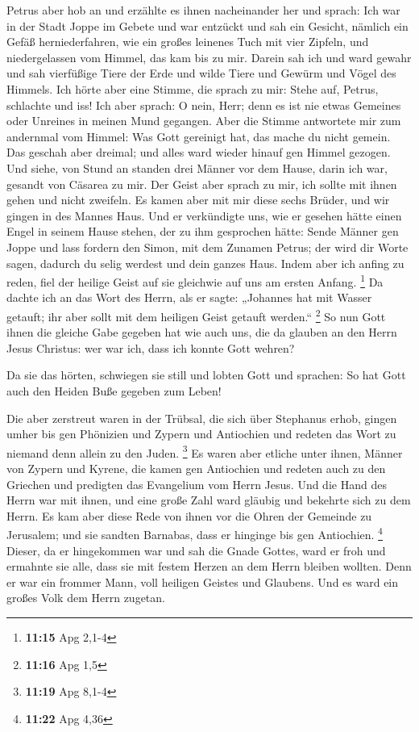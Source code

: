 Petrus aber hob an und erzählte es ihnen nacheinander her
und sprach:  Ich war in der Stadt Joppe im Gebete und war
entzückt und sah ein Gesicht, nämlich ein Gefäß herniederfahren, wie ein
großes leinenes Tuch mit vier Zipfeln, und niedergelassen vom Himmel,
das kam bis zu mir.  Darein sah ich und ward gewahr und
sah vierfüßige Tiere der Erde und wilde Tiere und Gewürm und Vögel des
Himmels.  Ich hörte aber eine Stimme, die sprach zu mir:
Stehe auf, Petrus, schlachte und iss!  Ich aber sprach: O
nein, Herr; denn es ist nie etwas Gemeines oder Unreines in meinen Mund
gegangen.  Aber die Stimme antwortete mir zum andernmal
vom Himmel: Was Gott gereinigt hat, das mache du nicht gemein.
 Das geschah aber dreimal; und alles ward wieder hinauf
gen Himmel gezogen.  Und siehe, von Stund an standen drei
Männer vor dem Hause, darin ich war, gesandt von Cäsarea zu mir.
 Der Geist aber sprach zu mir, ich sollte mit ihnen gehen
und nicht zweifeln. Es kamen aber mit mir diese sechs Brüder, und wir
gingen in des Mannes Haus.  Und er verkündigte uns, wie
er gesehen hätte einen Engel in seinem Hause stehen, der zu ihm
gesprochen hätte: Sende Männer gen Joppe und lass fordern den Simon, mit
dem Zunamen Petrus;  der wird dir Worte sagen, dadurch du
selig werdest und dein ganzes Haus.  Indem aber ich
anfing zu reden, fiel der heilige Geist auf sie gleichwie auf uns am
ersten Anfang. \footnote{\textbf{11:15} Apg 2,1-4}  Da
dachte ich an das Wort des Herrn, als er sagte: „Johannes hat mit Wasser
getauft; ihr aber sollt mit dem heiligen Geist getauft werden.``
\footnote{\textbf{11:16} Apg 1,5}  So nun Gott ihnen die
gleiche Gabe gegeben hat wie auch uns, die da glauben an den Herrn Jesus
Christus: wer war ich, dass ich konnte Gott wehren?

 Da sie das hörten, schwiegen sie still und lobten Gott
und sprachen: So hat Gott auch den Heiden Buße gegeben zum Leben!

 Die aber zerstreut waren in der Trübsal, die sich über
Stephanus erhob, gingen umher bis gen Phönizien und Zypern und
Antiochien und redeten das Wort zu niemand denn allein zu den Juden.
\footnote{\textbf{11:19} Apg 8,1-4}  Es waren aber
etliche unter ihnen, Männer von Zypern und Kyrene, die kamen gen
Antiochien und redeten auch zu den Griechen und predigten das Evangelium
vom Herrn Jesus.  Und die Hand des Herrn war mit ihnen,
und eine große Zahl ward gläubig und bekehrte sich zu dem Herrn.
 Es kam aber diese Rede von ihnen vor die Ohren der
Gemeinde zu Jerusalem; und sie sandten Barnabas, dass er hinginge bis
gen Antiochien. \footnote{\textbf{11:22} Apg 4,36} 
Dieser, da er hingekommen war und sah die Gnade Gottes, ward er froh und
ermahnte sie alle, dass sie mit festem Herzen an dem Herrn bleiben
wollten.  Denn er war ein frommer Mann, voll heiligen
Geistes und Glaubens. Und es ward ein großes Volk dem Herrn zugetan.

